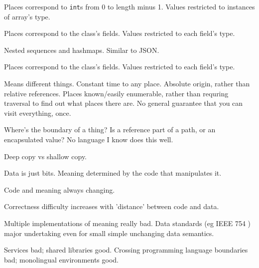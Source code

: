 \documentclass[11pt,openany]{book}
\begin{document}
\begin{example}
Places correspond to \texttt{int}s from 0 to length minus 1.
Values restricted to instances of array's type.
\end{example}  

\begin{example}
Places correspond to the class's fields.
Values restricted to each field's type.
\end{example}  

\begin{example}
Nested sequences and hashmaps. Similar to JSON.

Places correspond to the class's fields.
Values restricted to each field's type.
\end{example}  


Means different things. 
Constant time to any place.
Absolute origin, rather than relative references.
Places known/easily enumerable, rather than requring traversal
to find out what places there are.
No general guarantee that you can visit everything, once.

Where's the boundary of a thing? 
Is a reference part of a path, or
an encapsulated value?
No language I know does this well.

Deep copy vs shallow copy.

Data is just bits. 
Meaning determined by the code that manipulates it. 

Code and meaning always changing.

Correctness difficulty increases
with 'distance' between code and data. 

Multiple implementations of meaning really bad.
Data standards (eg IEEE 754 \cite{Higham2002ASNA, IEEE:1985:AIS,
P754:2008:ISF, Muller-et-al-2010}) major undertaking even for
small simple unchanging data semantics.

Services bad; shared libraries good.
Crossing programming language boundaries bad; 
monolingual environments \cite{Heering:1985:TMP:3318.3321} good.
\end{document}
